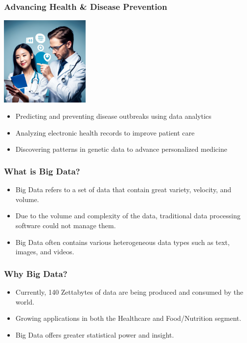\documentclass{beamer}
\begin{document}
    \begin{frame}
        \frametitle{Advancing Health \& Disease Prevention}
        \begin{center}
            \includegraphics[width=0.33\textwidth]{figures/healthcare-data-science.png}
        \end{center}
        \begin{itemize}
            \item Predicting and preventing disease outbreaks using data analytics
            \item Analyzing electronic health records to improve patient care
            \item Discovering patterns in genetic data to advance personalized medicine
        \end{itemize}
    \end{frame}
        
    \begin{frame}
        \frametitle{What is Big Data?}
        \begin{itemize}
            \item Big Data refers to a set of data that contain great variety, velocity, and volume.
            \item Due to the volume and complexity of the data, traditional data processing software could not manage them.
            \item Big Data often contains various heterogeneous data types such as text, images, and videos.
        \end{itemize}
    \end{frame}
        
    \begin{frame}
        \frametitle{Why Big Data?}
        \begin{itemize}
            \item Currently, 140 Zettabytes of data are being produced and consumed by the world.
            \item Growing applications in both the Healthcare and Food/Nutrition segment.
            \item Big Data offers greater statistical power and insight.
        \end{itemize}
    \end{frame}
        
\end{document}
